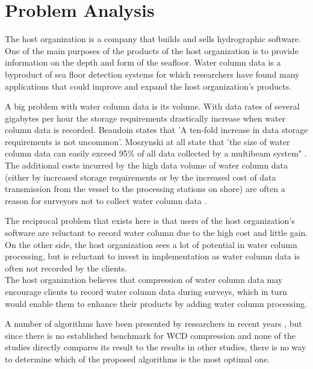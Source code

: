 \chapter{Problem Analysis}

The host organization is a company that builds and sells hydrographic software. One of the main purposes of the products of the host organization is to provide information on the depth and form of the seafloor.  Water column data is a byproduct of sea floor detection systems for which researchers have found many applications \cite{clarke2006applications}\cite{buelens2006computational} that could improve and expand the host organization's products.

A big problem with water column data is its volume. With data rates of several gigabytes per hour\cite{beaudoin2010application} the storage requirements drastically increase when water column data is recorded. Beaudoin states that 'A ten-fold increase in data storage requirements is not uncommon'\cite{beaudoin2010application}.  Moszynski at all state that 'the size of water column data can easily exceed 95\% of all data collected by a multibeam system" \cite{moszynski2013novel}. The additional costs incurred by the high data volume of water column data (either by increased storage requirements or by the increased cost of data transmission from the vessel to the processing stations on shore) are often a reason for surveyors not to collect water column data \cite{moszynski2013novel}\cite{beaudoin2010application}\cite{amblasreal}. 

The reciprocal problem that exists here is that users of the host organization's software are reluctant to record water column due to the high cost and little gain. On the other side, the host organization sees a lot of potential in water column processing, but is reluctant to invest in implementation as water column data is often not recorded by the clients. \\
The host organization believes that compression of water column data may encourage clients to record water column data during surveys, which in turn would enable them to enhance their products by adding water column processing.

A number of algorithms have been presented by researchers in recent years \cite{moszynski2013novel}\cite{beaudoin2010application}\cite{amblasreal}, but since there is no established benchmark for WCD compression and none of the studies directly compares its result to the results in other studies, there is no way to determine which of the proposed algorithms is the most optimal one. 

